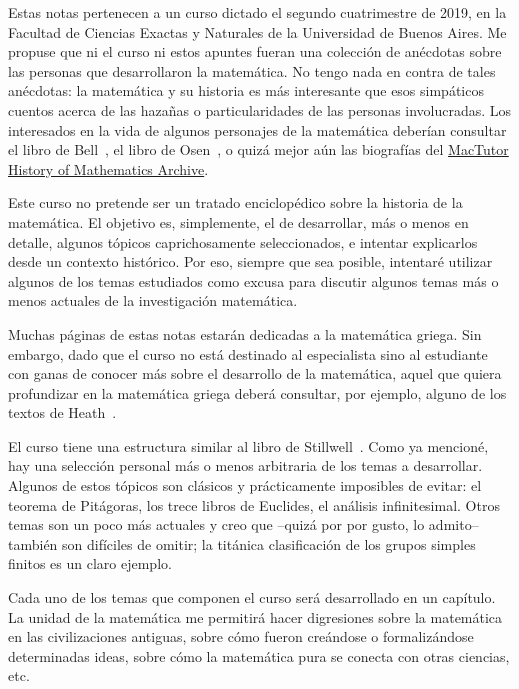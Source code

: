 \preface

Estas notas pertenecen a un curso dictado el segundo cuatrimestre de 2019, en
la Facultad de Ciencias Exactas y Naturales de la Universidad de Buenos Aires.
Me propuse que ni el curso ni estos apuntes fueran una colección
de anécdotas sobre las personas que desarrollaron la matemática. No tengo nada
en contra de tales anécdotas: la matemática y su historia es  
más interesante que esos simpáticos cuentos acerca de las hazañas o particularidades
de las personas involucradas.
Los interesados en la vida de algunos personajes de la matemática deberían
consultar el libro de Bell~\cite{MR3728304}, el libro de Osen~\cite{MR0497806},
o quizá mejor aún las biografías 
del \href{http://www-history.mcs.st-andrews.ac.uk/}{MacTutor History of Mathematics
Archive}.

Este curso no pretende ser un tratado enciclopédico sobre la historia de la
matemática. El objetivo es, simplemente, el de desarrollar, más o menos 
en detalle, algunos tópicos  
caprichosamente seleccionados, e intentar explicarlos desde un contexto
histórico. Por eso, siempre que sea posible, intentaré utilizar algunos de los 
temas estudiados como excusa para discutir  
algunos temas más o menos actuales de la investigación matemática. 

Muchas páginas de estas notas estarán dedicadas a la matemática
griega. Sin embargo, dado que el curso no está destinado al especialista sino 
al estudiante con ganas de conocer más sobre el desarrollo de la matemática, 
aquel que quiera profundizar en la matemática griega 
deberá consultar, por ejemplo, alguno de los textos de Heath~\cite{MR654679,
MR654680,MR0156760}. 

El curso tiene una estructura similar al libro de
Stillwell~\cite{MR2667826}.  Como ya mencioné, hay una selección personal 
más o menos arbitraria
de los temas a desarrollar. Algunos de estos tópicos son clásicos y
prácticamente imposibles de evitar: el teorema de Pitágoras, los trece libros
de Euclides, el análisis infinitesimal. Otros
temas son un poco más actuales y creo que --quizá por por gusto, lo admito-- 
también son difíciles de omitir; la titánica 
clasificación de los grupos simples finitos
es un claro ejemplo.

Cada uno de los temas que componen el curso será desarrollado en un capítulo. 
La unidad de la matemática me permitirá hacer digresiones
sobre la matemática en las civilizaciones antiguas, sobre cómo fueron creándose
o formalizándose determinadas ideas, sobre cómo la matemática pura se conecta
con otras ciencias, etc. 

